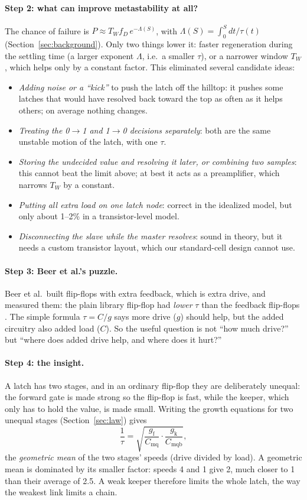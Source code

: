 \documentclass[11pt]{article}
\newcommand{\gf}{g_{\mathrm{f}}}
\newcommand{\gk}{g_{\mathrm{k}}}
\newcommand{\Cq}{C_{\mathrm{mq}}}
\newcommand{\Cqb}{C_{\mathrm{mqb}}}
\begin{document}
\paragraph{Step 2: what can improve metastability at all?} The chance of failure is
$P\approx T_W f_D\,e^{-\Lambda(S)}$, with $\Lambda(S)=\int_0^S dt/\tau(t)$ (Section~\ref{sec:background}). Only two
things lower it: faster regeneration during the settling time (a larger exponent $\Lambda$, i.e.\ a smaller $\tau$),
or a narrower window $T_W$, which helps only by a constant factor. This eliminated several candidate ideas:
\begin{itemize}
\item \emph{Adding noise or a ``kick''} to push the latch off the hilltop: it pushes some latches that would have
  resolved back toward the top as often as it helps others; on average nothing changes.
\item \emph{Treating the 0$\to$1 and 1$\to$0 decisions separately}: both are the same unstable motion of the latch,
  with one $\tau$.
\item \emph{Storing the undecided value and resolving it later, or combining two samples}: this cannot beat the limit
  above; at best it acts as a preamplifier, which narrows $T_W$ by a constant.
\item \emph{Putting all extra load on one latch node}: correct in the idealized model, but only about 1--2\% in a
  transistor-level model.
\item \emph{Disconnecting the slave while the master resolves}: sound in theory, but it needs a custom transistor
  layout, which our standard-cell design cannot use.
\end{itemize}

\paragraph{Step 3: Beer et al.'s puzzle.} Beer et al.\ built flip-flops with extra feedback, which is extra drive, and
measured them: the plain library flip-flop had \emph{lower} $\tau$ than the feedback flip-flops \cite{beer2011}. The simple formula
$\tau=C/g$ says more drive ($g$) should help, but the added circuitry also added load ($C$). So the useful question is
not ``how much drive?'' but ``where does added drive help, and where does it hurt?''

\paragraph{Step 4: the insight.} A latch has two stages, and in an ordinary flip-flop they are deliberately unequal: the
forward gate is made strong so the flip-flop is fast, while the keeper, which only has to hold the value, is made small.
Writing the growth equations for two unequal stages (Section~\ref{sec:law}) gives
\[
\frac{1}{\tau}=\sqrt{\frac{\gf}{\Cq}\cdot\frac{\gk}{\Cqb}},
\]
the \emph{geometric mean} of the two stages' speeds (drive divided by load). A geometric mean is dominated by its
smaller factor: speeds 4 and 1 give 2, much closer to 1 than their average of 2.5. A weak keeper therefore limits the
whole latch, the way the weakest link limits a chain.
\end{document}

